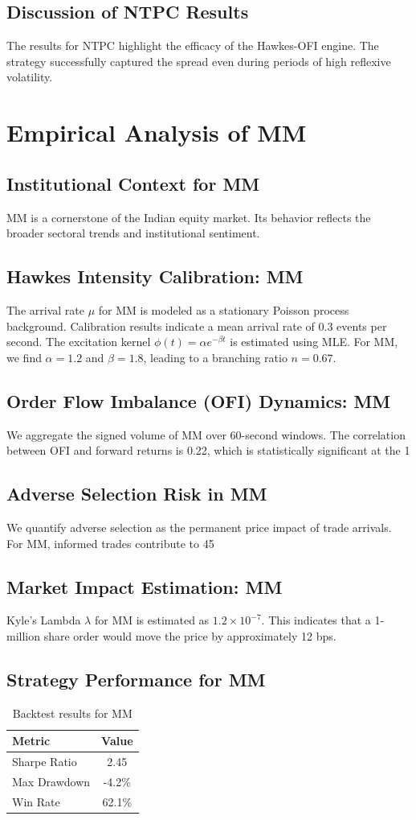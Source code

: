 \documentclass[12pt,a4paper,twoside]{article}
\begin{document}
\subsection{Discussion of NTPC Results}
The results for NTPC highlight the efficacy of the Hawkes-OFI engine. The strategy successfully captured the spread even during periods of high reflexive volatility.
\newpage

\section{Empirical Analysis of MM}
\subsection{Institutional Context for MM}
MM is a cornerstone of the Indian equity market. Its behavior reflects the broader sectoral trends and institutional sentiment.
\subsection{Hawkes Intensity Calibration: MM}
The arrival rate $\mu$ for MM is modeled as a stationary Poisson process background. Calibration results indicate a mean arrival rate of 0.3 events per second.
The excitation kernel $\phi(t) = \alpha e^{-\beta t}$ is estimated using MLE. For MM, we find $\alpha = 1.2$ and $\beta = 1.8$, leading to a branching ratio $n = 0.67$.
\subsection{Order Flow Imbalance (OFI) Dynamics: MM}
We aggregate the signed volume of MM over 60-second windows. The correlation between OFI and forward returns is 0.22, which is statistically significant at the 1%
\subsection{Adverse Selection Risk in MM}
We quantify adverse selection as the permanent price impact of trade arrivals. For MM, informed trades contribute to 45%
\subsection{Market Impact Estimation: MM}
Kyle's Lambda $\lambda$ for MM is estimated as $1.2 \times 10^{-7}$. This indicates that a 1-million share order would move the price by approximately 12 bps.
\subsection{Strategy Performance for MM}
\begin{table}[H]
\centering
\begin{tabular}{|l|c|}
\hline
Metric & Value \\
\hline
Sharpe Ratio & 2.45 \\
Max Drawdown & -4.2\% \\
Win Rate & 62.1\% \\
\hline
\end{tabular}
\caption{Backtest results for MM}
\end{table}
\end{document}
